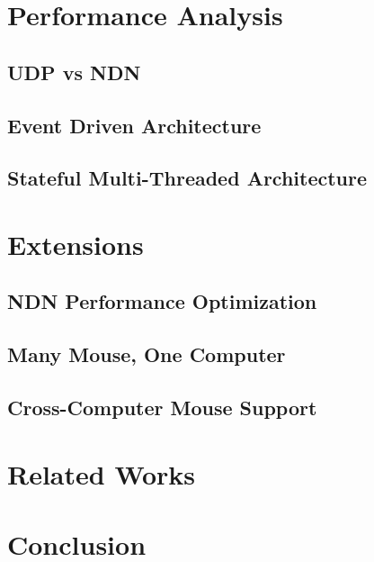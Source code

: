 \documentclass{sig-alternate}
\renewcommand\_{\textunderscore\allowbreak}  %
\begin{document}
\section{Performance Analysis}

\subsection{UDP vs NDN}

\subsection{Event Driven Architecture}

\subsection{Stateful Multi-Threaded Architecture}

\section{Extensions}

\subsection{NDN Performance Optimization}

\subsection{Many Mouse, One Computer}

\subsection{Cross-Computer Mouse Support}

\section{Related Works}

\section{Conclusion}
\end{document}
